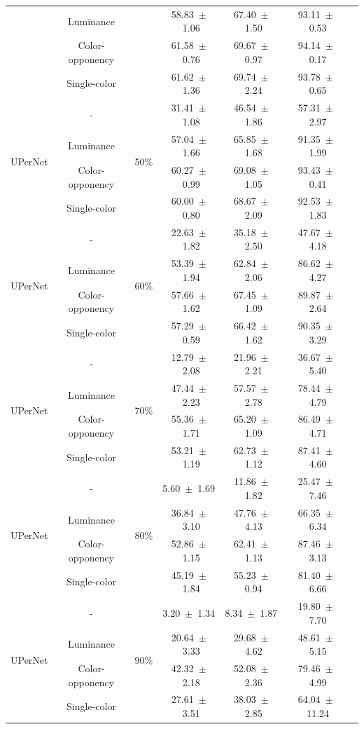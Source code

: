 \begin{table}[h]
\begin{tabular}{@{}lccc ccc@{}}
& Luminance & & 58.83~$\pm$~1.06 & 67.40~$\pm$~1.50 & 93.11~$\pm$~0.53 \\
& Color-opponency & & 61.58~$\pm$~0.76 & 69.67~$\pm$~0.97 & 94.14~$\pm$~0.17 \\
& Single-color & & 61.62~$\pm$~1.36 & 69.74~$\pm$~2.24 & 93.78~$\pm$~0.65 \\
\midrule
\multirow{4}{*}{UPerNet} & - & \multirow{4}{*}{50\%} & 31.41~$\pm$~1.08 & 46.54~$\pm$~1.86 & 57.31~$\pm$~2.97 \\
& Luminance & & 57.04~$\pm$~1.66 & 65.85~$\pm$~1.68 & 91.35~$\pm$~1.99 \\
& Color-opponency & & 60.27~$\pm$~0.99 & 69.08~$\pm$~1.05 & 93.43~$\pm$~0.41 \\
& Single-color & & 60.00~$\pm$~0.80 & 68.67~$\pm$~2.09 & 92.53~$\pm$~1.83 \\
\midrule
\multirow{4}{*}{UPerNet} & - & \multirow{4}{*}{60\%} & 22.63~$\pm$~1.82 & 35.18~$\pm$~2.50 & 47.67~$\pm$~4.18 \\
& Luminance & & 53.39~$\pm$~1.94 & 62.84~$\pm$~2.06 & 86.62~$\pm$~4.27 \\
& Color-opponency & & 57.66~$\pm$~1.62 & 67.45~$\pm$~1.09 & 89.87~$\pm$~2.64 \\
& Single-color & & 57.29~$\pm$~0.59 & 66.42~$\pm$~1.62 & 90.35~$\pm$~3.29 \\
\midrule
\multirow{4}{*}{UPerNet} & - & \multirow{4}{*}{70\%} & 12.79~$\pm$~2.08 & 21.96~$\pm$~2.21 & 36.67~$\pm$~5.40 \\
& Luminance & & 47.44~$\pm$~2.23 & 57.57~$\pm$~2.78 & 78.44~$\pm$~4.79 \\
& Color-opponency & & 55.36~$\pm$~1.71 & 65.20~$\pm$~1.09 & 86.49~$\pm$~4.71 \\
& Single-color & & 53.21~$\pm$~1.19 & 62.73~$\pm$~1.12 & 87.41~$\pm$~4.60 \\
\midrule
\multirow{4}{*}{UPerNet} & - & \multirow{4}{*}{80\%} & 5.60~$\pm$~1.69 & 11.86~$\pm$~1.82 & 25.47~$\pm$~7.46 \\
& Luminance & & 36.84~$\pm$~3.10 & 47.76~$\pm$~4.13 & 66.35~$\pm$~6.34 \\
& Color-opponency & & 52.86~$\pm$~1.15 & 62.41~$\pm$~1.13 & 87.46~$\pm$~3.13 \\
& Single-color & & 45.19~$\pm$~1.84 & 55.23~$\pm$~0.94 & 81.40~$\pm$~6.66 \\
\midrule
\multirow{4}{*}{UPerNet} & - & \multirow{4}{*}{90\%} & 3.20~$\pm$~1.34 & 8.34~$\pm$~1.87 & 19.80~$\pm$~7.70 \\
& Luminance & & 20.64~$\pm$~3.33 & 29.68~$\pm$~4.62 & 48.61~$\pm$~5.15 \\
& Color-opponency & & 42.32~$\pm$~2.18 & 52.08~$\pm$~2.36 & 79.46~$\pm$~4.99 \\
& Single-color & & 27.61~$\pm$~3.51 & 38.03~$\pm$~2.85 & 64.04~$\pm$~11.24 \\
\midrule
\bottomrule
\end{tabular}
\label{tab:sparse_results_upernet_cityscapes}
\end{table}